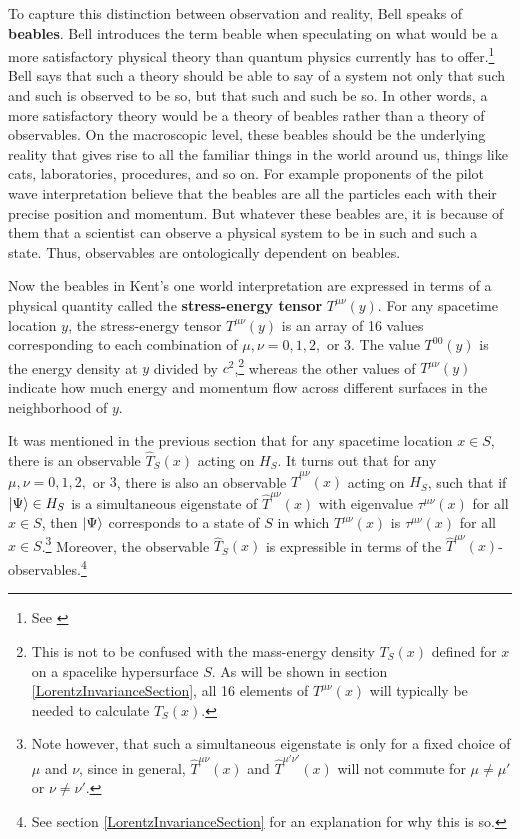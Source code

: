 To capture this distinction between observation and reality, Bell speaks of \textbf{beables}.\label{beabledef} Bell introduces the term beable when speculating on what would be a more satisfactory physical theory than quantum physics currently has to offer.\footnote{See \cite{Bell2}} Bell says that such a theory should be able to say of a system not only that such and such is observed to be so, but that such and such be so. In other words, a more satisfactory theory would be a theory of beables rather than a theory of observables. On the macroscopic level, these beables should be the underlying reality that gives rise to all the familiar things in the world around us, things like cats, laboratories, procedures, and so on. For example proponents of the pilot wave interpretation believe that the beables are all the particles each with their precise position and momentum. But whatever these beables are, it is because of them that a scientist can observe a physical system to be in such and such a state. Thus, observables are ontologically dependent on beables.   

Now the beables in Kent's one world interpretation are expressed in terms of a physical quantity called the \textbf{stress-energy tensor}  $T^{\mu\nu}(y)$.\label{stressenergy}  For any spacetime location $y$, the stress-energy tensor $T^{\mu\nu}(y)$ is an array of 16 values corresponding to each combination of $\mu, \nu=0,1,2,$ or $3$. The value $T^{00}(y)$ is the energy density at $y$ divided by $c^2$,\footnote{This is not to be confused with the mass-energy density $T_S(x)$ defined for $x$ on a spacelike hypersurface $S$. As will be shown in section \ref{LorentzInvarianceSection},   all 16 elements of $T^{\mu\nu}(x)$ will typically be needed to calculate $T_S(x)$.} whereas the other values of $T^{\mu\nu}(y)$ indicate how much energy and momentum flow across different surfaces in the neighborhood of $y$. 

It was mentioned in the previous section that for any spacetime location $x\in S$, there is an observable $\hat{T}_S(x)$ acting on $H_S$. It turns out that for any $\mu, \nu=0,1,2,$ or $3$, there is also an observable  $\hat{T}^{\mu\nu}(x)$ acting on $H_S$, such that if $\ket{\Psi}\in H_S$ is a simultaneous eigenstate of $\hat{T}^{\mu\nu}(x)$ with eigenvalue $\tau^{\mu\nu}(x)$ for all $x\in S$, then $\ket{\Psi}$ corresponds to a state of $S$ in which $T^{\mu\nu}(x)$ is  $\tau^{\mu\nu}(x)$ for all $x\in S$.\footnote{Note however, that such a simultaneous eigenstate is only for a fixed choice of $\mu$ and $\nu$, since in general, $\hat{T}^{\mu\nu}(x)$ and $\hat{T}^{\mu'\nu'}(x)$ will not commute for $\mu\neq\mu'$ or $\nu\neq\nu'$. } Moreover, the observable $\hat{T}_S(x)$ is expressible in terms of the  $\hat{T}^{\mu\nu}(x)$-observables.\footnote{See section  \ref{LorentzInvarianceSection} for an explanation for why this is so.} 

